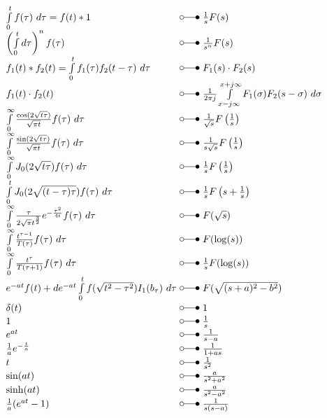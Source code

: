 \[ \begin{array}{@{}l@{ ~ \laplace ~ }l@{}}
\int\limits_0^t f(\tau) ~ d \tau = f(t) * 1 &
    \frac{1}{s} F(s) \\
\left(\int\limits_0^t d\tau\right)^n f(\tau) &
    \frac{1}{s^n} F(s) \\
f_1(t) * f_2(t) = \int\limits_0^t f_1(\tau) f_2(t - \tau) ~ d \tau &
    F_1(s) \cdot F_2(s) \\
f_1(t) \cdot f_2(t) &
    \frac{1}{2 \pi j} \int\limits_{x-j\infty}^{x+j\infty} F_1(\sigma) F_2(s - \sigma) ~ d\sigma \\
\int\limits_0^\infty \frac{\cos(2 \sqrt{t \tau})}{\sqrt{\pi t}} f(\tau) ~ d\tau &
    \frac{1}{\sqrt{s}} F\left(\frac{1}{s}\right) \\
\int\limits_0^\infty \frac{\sin(2 \sqrt{t \tau})}{\sqrt{\pi t}} f(\tau) ~ d\tau &
    \frac{1}{s\sqrt{s}} F\left(\frac{1}{s}\right) \\
\int\limits_0^\infty J_0(2 \sqrt{t \tau}) f(\tau) ~ d\tau &
    \frac{1}{s} F\left(\frac{1}{s}\right) \\
\int\limits_0^t J_0(2 \sqrt{(t - \tau)\tau}) f(\tau) ~ d\tau &
    \frac{1}{s} F\left(s + \frac{1}{s}\right) \\
\int\limits_0^\infty \frac{\tau}{2 \sqrt{\pi} t^{\frac{3}{2}}} e^{-\frac{\tau^2}{4 t}} f(\tau) ~ d\tau &
    F(\sqrt{s}) \\
\int\limits_0^\infty \frac{t^{\tau - 1}}{T(\tau)} f(\tau) ~ d\tau &
    F(\log(s)) \\
\int\limits_0^\infty \frac{t^\tau}{T(\tau + 1)} f(\tau) ~d\tau &
    \frac{1}{s} F(\log(s)) \\
e^{-at} f(t) + d e^{-at} \int\limits_0^t f(\sqrt{t^2 - \tau^2}) I_1(b_\tau) ~ d\tau &
    F(\sqrt{(s + a)^2 - b^2}) \\
\delta(t) &
    1 \\
1 &
    \frac{1}{s} \\
e^{at} &
    \frac{1}{s - a} \\
\frac{1}{a} e^{-\frac{t}{a}} &
    \frac{1}{1 + as} \\
t &
    \frac{1}{s^2} \\
\sin(at) &
    \frac{a}{s^2 + a^2} \\
\sinh(at) &
    \frac{a}{s^2 - a^2} \\
\frac{1}{a} (e^{at} - 1) &
\frac{1}{s (s - a)} \\
\end{array} \]

